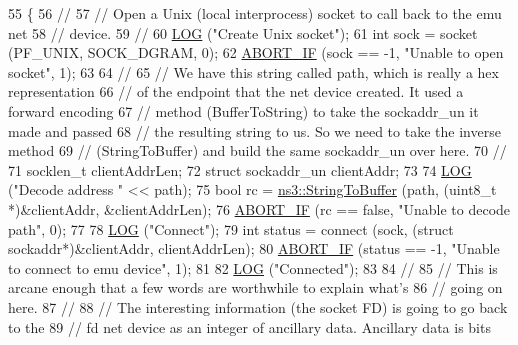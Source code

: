 \begin{DoxyCode}
55 \{
56   \textcolor{comment}{//}
57   \textcolor{comment}{// Open a Unix (local interprocess) socket to call back to the emu net}
58   \textcolor{comment}{// device.}
59   \textcolor{comment}{//}
60   \hyperlink{creator-utils_8h_a158a8c64f24645c7478298399825737f}{LOG} (\textcolor{stringliteral}{"Create Unix socket"});
61   \textcolor{keywordtype}{int} sock = socket (PF\_UNIX, SOCK\_DGRAM, 0);
62   \hyperlink{creator-utils_8h_a91c11c90ad2f1672fbd3c031038dce16}{ABORT\_IF} (sock == -1, \textcolor{stringliteral}{"Unable to open socket"}, 1);
63 
64   \textcolor{comment}{//}
65   \textcolor{comment}{// We have this string called path, which is really a hex representation}
66   \textcolor{comment}{// of the endpoint that the net device created.  It used a forward encoding}
67   \textcolor{comment}{// method (BufferToString) to take the sockaddr\_un it made and passed}
68   \textcolor{comment}{// the resulting string to us.  So we need to take the inverse method}
69   \textcolor{comment}{// (StringToBuffer) and build the same sockaddr\_un over here.}
70   \textcolor{comment}{//}
71   socklen\_t clientAddrLen;
72   \textcolor{keyword}{struct }sockaddr\_un clientAddr;
73 
74   \hyperlink{creator-utils_8h_a158a8c64f24645c7478298399825737f}{LOG} (\textcolor{stringliteral}{"Decode address "} << path);
75   \textcolor{keywordtype}{bool} rc = \hyperlink{namespacens3_a8582a97439c4fae64f9d073a91fc7699}{ns3::StringToBuffer} (path, (uint8\_t *)&clientAddr, &clientAddrLen);
76   \hyperlink{creator-utils_8h_a91c11c90ad2f1672fbd3c031038dce16}{ABORT\_IF} (rc == \textcolor{keyword}{false}, \textcolor{stringliteral}{"Unable to decode path"}, 0);
77 
78   \hyperlink{creator-utils_8h_a158a8c64f24645c7478298399825737f}{LOG} (\textcolor{stringliteral}{"Connect"});
79   \textcolor{keywordtype}{int} status = connect (sock, (\textcolor{keyword}{struct} sockaddr*)&clientAddr, clientAddrLen);
80   \hyperlink{creator-utils_8h_a91c11c90ad2f1672fbd3c031038dce16}{ABORT\_IF} (status == -1, \textcolor{stringliteral}{"Unable to connect to emu device"}, 1);
81 
82   \hyperlink{creator-utils_8h_a158a8c64f24645c7478298399825737f}{LOG} (\textcolor{stringliteral}{"Connected"});
83 
84   \textcolor{comment}{//}
85   \textcolor{comment}{// This is arcane enough that a few words are worthwhile to explain what's}
86   \textcolor{comment}{// going on here.}
87   \textcolor{comment}{//}
88   \textcolor{comment}{// The interesting information (the socket FD) is going to go back to the}
89   \textcolor{comment}{// fd net device as an integer of ancillary data.  Ancillary data is bits}

\end{DoxyCode}
